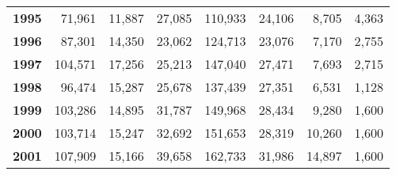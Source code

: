 {\begin{table}[h]
{\begin{tabular}{@{}>{\bfseries}r r r r r r r r@{}}
1995 & 71,961 & 11,887 & 27,085 & 110,933 & 24,106 & 8,705 & 4,363 \\
1996 & 87,301 & 14,350 & 23,062 & 124,713 & 23,076 & 7,170 & 2,755 \\
1997 & 104,571 & 17,256 & 25,213 & 147,040 & 27,471 & 7,693 & 2,715 \\
1998 & 96,474 & 15,287 & 25,678 & 137,439 & 27,351 & 6,531 & 1,128 \\
1999 & 103,286 & 14,895 & 31,787 & 149,968 & 28,434 & 9,280 & 1,600 \\
2000 & 103,714 & 15,247 & 32,692 & 151,653 & 28,319 & 10,260 & 1,600 \\
2001 & 107,909 & 15,166 & 39,658 & 162,733 & 31,986 & 14,897 & 1,600 \\
\bottomrule
\end{tabular}
}
\end{table}

\thispagestyle{empty}
\clearpage %
}
